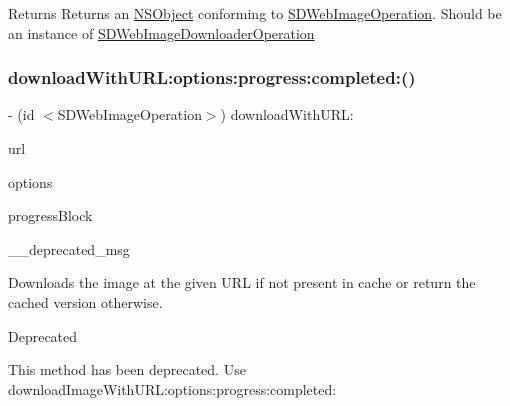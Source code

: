 \begin{DoxyReturn}{Returns}
Returns an \mbox{\hyperlink{class_n_s_object-p}{N\+S\+Object}} conforming to \mbox{\hyperlink{class_s_d_web_image_operation-p}{S\+D\+Web\+Image\+Operation}}. Should be an instance of \mbox{\hyperlink{interface_s_d_web_image_downloader_operation}{S\+D\+Web\+Image\+Downloader\+Operation}} 
\end{DoxyReturn}
\mbox{\label{interface_s_d_web_image_manager_a6ed93377fa34b44c02bce84279529dad}} 
\subsubsection{\texorpdfstring{download\+With\+U\+R\+L\+:options\+:progress\+:completed\+:()}{downloadWithURL:options:progress:completed:()}\hspace{0.1cm}{\footnotesize\ttfamily [1/3]}}
{\footnotesize\ttfamily -\/ (id $<$S\+D\+Web\+Image\+Operation$>$) download\+With\+U\+R\+L\+: \begin{DoxyParamCaption}\item[{(N\+S\+U\+RL $\ast$)}]{url }\item[{options:(S\+D\+Web\+Image\+Options)}]{options }\item[{progress:(S\+D\+Web\+Image\+Downloader\+Progress\+Block)}]{progress\+Block }\item[{completed:(\char`\"{}Method deprecated. Use \`{}\mbox{\hyperlink{interface_s_d_web_image_manager_ab094c361edd5ff886cbf484892e688be}{download\+Image\+With\+U\+R\+L\+:options\+:progress\+:completed\+:}}\`{}\char`\"{})}]{\+\_\+\+\_\+deprecated\+\_\+msg }\end{DoxyParamCaption}}

Downloads the image at the given U\+RL if not present in cache or return the cached version otherwise.

\begin{DoxyRefDesc}{Deprecated}
\item[\mbox{\hyperlink{deprecated__deprecated000032}{Deprecated}}]This method has been deprecated. Use {\ttfamily download\+Image\+With\+U\+R\+L\+:options\+:progress\+:completed\+:} \end{DoxyRefDesc}


